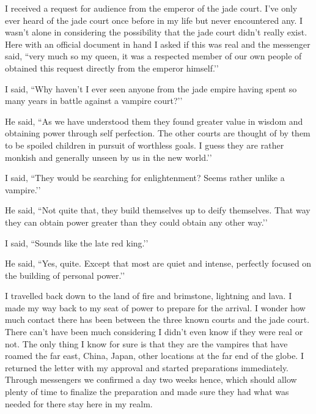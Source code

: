 ﻿I received a request for audience from the emperor of the jade court. I’ve only ever heard of the jade court once before in my life but never encountered any. I wasn’t alone in considering the possibility that the jade court didn’t really exist. Here with an official document in hand I asked if this was real and the messenger said, ``very much so my queen, it was a respected member of our own people of obtained this request directly from the emperor himself.’’

I said, ``Why haven’t I ever seen anyone from the jade empire having spent so many years in battle against a vampire court?’’

He said, ``As we have understood them they found greater value in wisdom and obtaining power through self perfection. The other courts are thought of by them to be spoiled children in pursuit of worthless goals. I guess they are rather monkish and generally unseen by us in the new world.’’

I said, ``They would be searching for enlightenment? Seems rather unlike a vampire.’’

He said, ``Not quite that, they build themselves up to deify themselves. That way they can obtain power greater than they could obtain any other way.’’

I said, ``Sounds like the late red king.’’

He said, ``Yes, quite. Except that most are quiet and intense, perfectly focused on the building of personal power.’’

I travelled back down to the land of fire and brimstone, lightning and lava. I made my way back to my seat of power to prepare for the arrival. I wonder how much contact there has been between the three known courts and the jade court. There can’t have been much considering I didn’t even know if they were real or not. The only thing I know for sure is that they are the vampires that have roamed the far east, China, Japan, other locations at the far end of the globe. I returned the letter with my approval and started preparations immediately. Through messengers we confirmed a day two weeks hence, which should allow plenty of time to finalize the preparation and made sure they had what was needed for there stay here in my realm.

